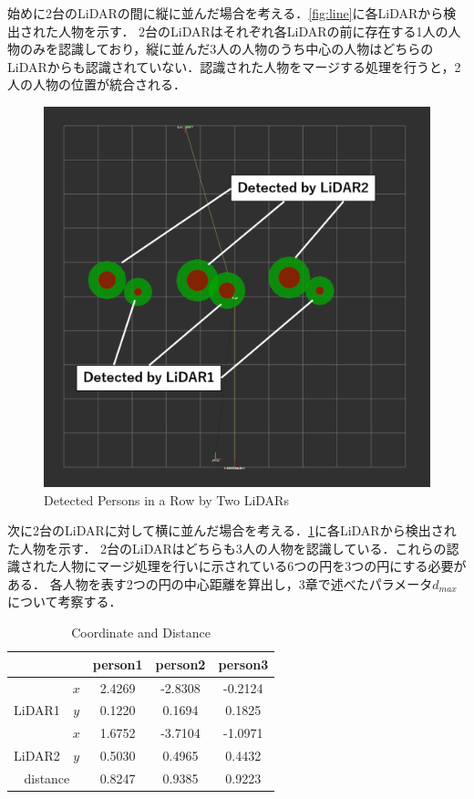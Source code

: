 \documentclass[autodetect-engine,dvipdfmx-if-dvi,ja=standard,a4j,jbase=11pt,magstyle=nomag*]{bxjsreport}
\begin{document}
始めに2台のLiDARの間に縦に並んだ場合を考える．\cref{fig:line}に各LiDARから検出された人物を示す．
2台のLiDARはそれぞれ各LiDARの前に存在する1人の人物のみを認識しており，縦に並んだ3人の人物のうち中心の人物はどちらのLiDARからも認識されていない．認識された人物をマージする処理を行うと，2人の人物の位置が統合される．


\begin{figure}[h]
    \centering
    \includegraphics[width=0.7\linewidth, clip]{./figure/chapter5/row.png}
    \caption{Detected Persons in a Row by Two LiDARs}
    \label{fig:row}
\end{figure}

次に2台のLiDARに対して横に並んだ場合を考える．\cref{fig:row}に各LiDARから検出された人物を示す．
2台のLiDARはどちらも3人の人物を認識している．これらの認識された人物にマージ処理を行いに示されている6つの円を3つの円にする必要がある．
各人物を表す2つの円の中心距離を算出し，3章で述べたパラメータ$d_{max}$について考察する．

\begin{table}[h]
  \centering
  \caption{Coordinate and Distance}
  \begin{tabular}{|c|c|c|c|c|} \hline
	\multicolumn{2}{|c|}{} & \multicolumn{1}{|c|}{person1} & \multicolumn{1}{|c|}{person2} & \multicolumn{1}{|c|}{person3}\\ \hline \hline
	& $x$ & 2.4269 & -2.8308 &  -0.2124 \\ \cline{2-5}
	LiDAR1 & $y$ &  0.1220 & 0.1694 &  0.1825 \\ \hline
	& $x$ & 1.6752 & -3.7104 & -1.0971 \\ \cline{2-5}
	LiDAR2 & $y$ &  0.5030 & 0.4965 &  0.4432 \\ \hline \hline
	\multicolumn{2}{|c|}{distance} & \multicolumn{1}{|c|}{0.8247} & \multicolumn{1}{|c|}{0.9385} & \multicolumn{1}{|c|}{0.9223}\\ \hline
 \end{tabular}
 \label{tab:distance}
\end{table}
\end{document}
